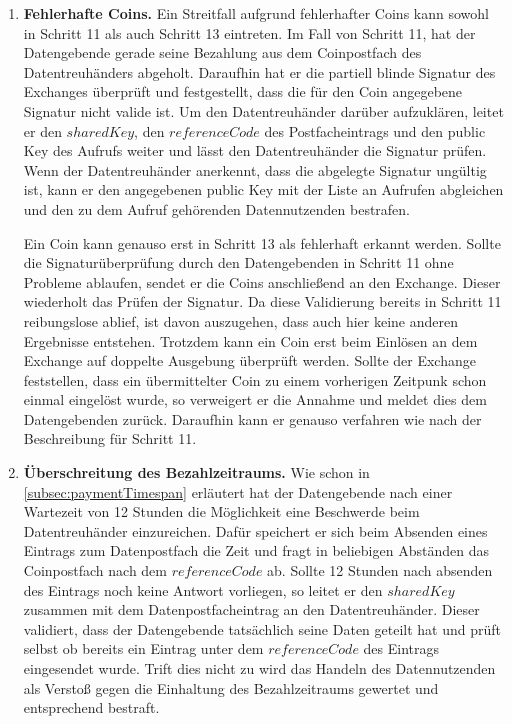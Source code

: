 \documentclass{scrreprt}
\begin{document}
\begin{enumerate}
    \item \textbf{Fehlerhafte Coins.}\label{case:IncorrectCoins}
    Ein Streitfall aufgrund fehlerhafter Coins kann sowohl in Schritt 11 als auch Schritt 13 eintreten. Im Fall von Schritt 11, hat der Datengebende gerade seine Bezahlung aus dem Coinpostfach des Datentreuhänders abgeholt. Daraufhin hat er die partiell blinde Signatur des Exchanges überprüft und festgestellt, dass die für den Coin angegebene Signatur nicht valide ist. Um den Datentreuhänder darüber aufzuklären, leitet er den $sharedKey$, den $referenceCode$ des Postfacheintrags und den public Key des Aufrufs weiter und lässt den Datentreuhänder die Signatur prüfen. Wenn der Datentreuhänder anerkennt, dass die abgelegte Signatur ungültig ist, kann er den angegebenen public Key mit der Liste an Aufrufen abgleichen und den zu dem Aufruf gehörenden Datennutzenden bestrafen.
    
    Ein Coin kann genauso erst in Schritt 13 als fehlerhaft erkannt werden. Sollte die Signaturüberprüfung durch den Datengebenden in Schritt 11 ohne Probleme ablaufen, sendet er die Coins anschließend an den Exchange. Dieser wiederholt das Prüfen der Signatur. Da diese Validierung bereits in Schritt 11 reibungslose ablief, ist davon auszugehen, dass auch hier keine anderen Ergebnisse entstehen. Trotzdem kann ein Coin erst beim Einlösen an dem Exchange auf doppelte Ausgebung überprüft werden. Sollte der Exchange feststellen, dass ein übermittelter Coin zu einem vorherigen Zeitpunk schon einmal eingelöst wurde, so verweigert er die Annahme und meldet dies dem Datengebenden zurück. Daraufhin kann er genauso verfahren wie nach der Beschreibung für Schritt 11.

    \item \textbf{Überschreitung des Bezahlzeitraums.} \label{case:paymentExceeded}
    Wie schon in \ref{subsec:paymentTimespan} erläutert hat der Datengebende nach einer Wartezeit von 12 Stunden die Möglichkeit eine Beschwerde beim Datentreuhänder einzureichen. Dafür speichert er sich beim Absenden eines Eintrags zum Datenpostfach die Zeit und fragt in beliebigen Abständen das Coinpostfach nach dem $referenceCode$ ab. Sollte 12 Stunden nach absenden des Eintrags noch keine Antwort vorliegen, so leitet er den $sharedKey$ zusammen mit dem Datenpostfacheintrag an den Datentreuhänder. Dieser validiert, dass der Datengebende tatsächlich seine Daten geteilt hat und prüft selbst ob bereits ein Eintrag unter dem $referenceCode$ des Eintrags eingesendet wurde. Trift dies nicht zu wird das Handeln des Datennutzenden als Verstoß gegen die Einhaltung des Bezahlzeitraums gewertet und entsprechend bestraft.
\end{enumerate}
\end{document}
